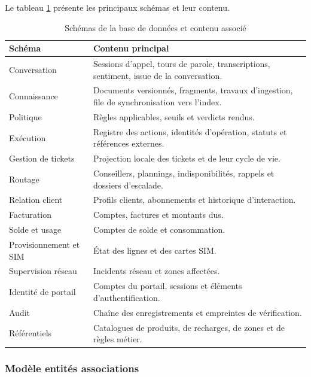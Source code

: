 Le tableau \ref{tab:schemas} présente les principaux schémas et leur contenu.

\begin{table}[H]
\centering
\renewcommand{\arraystretch}{1.2}
\begin{tabular}{|p{3.2cm}|p{11.3cm}|}
\hline
\textbf{Schéma} & \textbf{Contenu principal} \\
\hline
Conversation & Sessions d'appel, tours de parole, transcriptions, sentiment, issue de la conversation. \\
\hline
Connaissance & Documents versionnés, fragments, travaux d'ingestion, file de synchronisation vers l'index. \\
\hline
Politique & Règles applicables, seuils et verdicts rendus. \\
\hline
Exécution & Registre des actions, identités d'opération, statuts et références externes. \\
\hline
Gestion de tickets & Projection locale des tickets et de leur cycle de vie. \\
\hline
Routage & Conseillers, plannings, indisponibilités, rappels et dossiers d'escalade. \\
\hline
Relation client & Profils clients, abonnements et historique d'interaction. \\
\hline
Facturation & Comptes, factures et montants dus. \\
\hline
Solde et usage & Comptes de solde et consommation. \\
\hline
Provisionnement et SIM & État des lignes et des cartes SIM. \\
\hline
Supervision réseau & Incidents réseau et zones affectées. \\
\hline
Identité de portail & Comptes du portail, sessions et éléments d'authentification. \\
\hline
Audit & Chaîne des enregistrements et empreintes de vérification. \\
\hline
Référentiels & Catalogues de produits, de recharges, de zones et de règles métier. \\
\hline
\end{tabular}
\caption{Schémas de la base de données et contenu associé}
\label{tab:schemas}
\end{table}

\subsubsection{Modèle entités associations}

